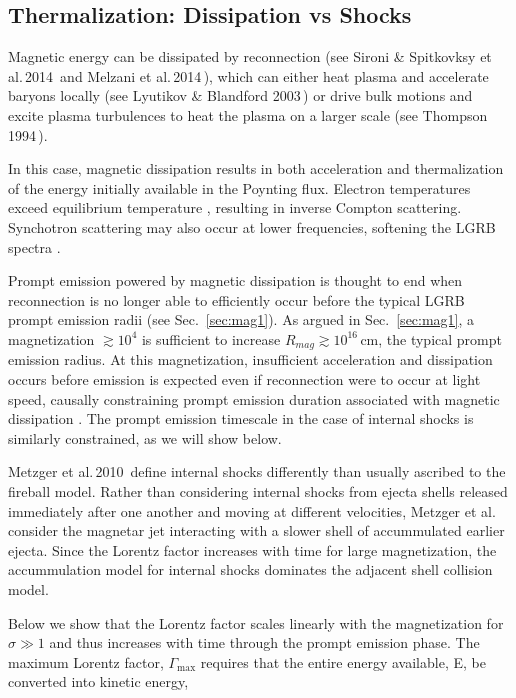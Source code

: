 \documentclass{article}
\begin{document}
\subsection{Thermalization: Dissipation vs Shocks} \label{sec:therm}

Magnetic energy can be dissipated by reconnection (see Sironi \& Spitkovksy et al.\,2014\,\cite{Sironi:2014jfa} and Melzani et al.\,2014\,\cite{Melzani:2014jsa}), which can either heat plasma and accelerate baryons locally (see Lyutikov \& Blandford 2003\,\cite{Lyutikov:2003ih}) or drive bulk motions and excite plasma turbulences to heat the plasma on a larger scale (see Thompson 1994\,\cite{Thompson:1994ap}).

In this case, magnetic dissipation results in both acceleration and thermalization of the energy initially available in the Poynting flux. Electron temperatures exceed equilibrium temperature \cite{Metzger:2010pp}, resulting in inverse Compton scattering. Synchotron scattering may also occur at lower frequencies, softening the LGRB spectra \cite{Metzger:2010pp}.

Prompt emission powered by magnetic dissipation is thought to end when reconnection is no longer able to efficiently occur before the typical LGRB prompt emission radii (see Sec.~\ref{sec:mag1}). As argued in Sec.~\ref{sec:mag1}, a magnetization $\gtrsim 10^4$ is sufficient to increase $R_{mag} \gtrsim 10^{16}$\,cm, the typical prompt emission radius. At this magnetization, insufficient acceleration and dissipation occurs before emission is expected even if reconnection were to occur at light speed, causally constraining prompt emission duration associated with magnetic dissipation \cite{Lyubarsky:2000yn}. The prompt emission timescale in the case of internal shocks is similarly constrained, as we will show below.

Metzger et al.\,2010\,\cite{Metzger:2010pp} define internal shocks differently than usually ascribed to the fireball model. Rather than considering internal shocks from ejecta shells released immediately after one another and moving at different velocities, Metzger et al. consider the magnetar jet interacting with a slower shell of accummulated earlier ejecta. Since the Lorentz factor increases with time for large magnetization, the accummulation model for internal shocks dominates the adjacent shell collision model.

Below we show that the Lorentz factor scales linearly with the magnetization for $\sigma \gg 1$ and thus increases with time through the prompt emission phase.
The maximum Lorentz factor, $\Gamma_{\mathrm{max}}$ requires that the entire energy available, E, be converted into kinetic energy,
\end{document}
